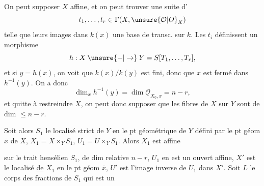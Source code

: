 
On peut supposer $X$ affine, et on peut trouver une suite d'
\[
t_1,\ldots,t_r\in\Gamma(X,\unsure{\mathcal O|O}_X)
\]
telle que leurs images dans $k(x)$  une base de transc. sur $k$. Les $t_i$ définissent un morphisme
\[
h:X\mathbin{\unsure{-|\to}}Y=S[T_1,\ldots,T_r],
\]
et si $y=h(x)$, on voit que $k(x)/k(y)$ est fini, donc que $x$ est fermé dans $h^{-1}(y)$. On a donc
\[
\dim_x h^{-1}(y)=\dim\underline{\mathcal O}_{X_0,x}=n-r,
\]
et quitte à restreindre $X$, on peut donc supposer que les fibres de $X$ sur $Y$ sont de dim $\leq n-r$.

Soit alors $S_1$ le localisé strict de $Y$ en le  pt géométrique de $Y$ défini par le pt géom $\bar x$ de $X$, $X_1=X\times_Y S_1$, $U_1=U\times_Y S_1$. Alors $X_1$ est affine

 sur le trait  hensélien $S_1$, de dim relative $n-r$, $U_1$ en est un ouvert affine, $X'$ est le localisé  \uline{de} $X_1$ en le pt géom $\bar x$, $U'$ est l'image inverse de $U_1$ dans $X'$. Soit $L$ le corps des fractions de $S_1$ qui est un
